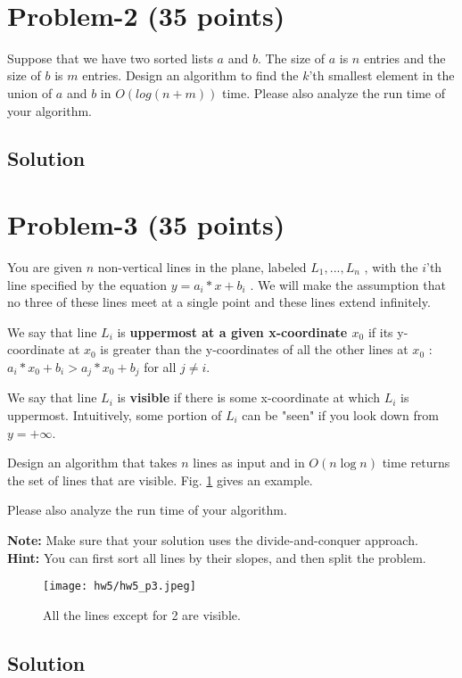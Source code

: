 \documentclass[11pt]{article}
\begin{document}
​
\newpage
\section*{Problem-2 (35 points)}
\noindent
Suppose that we have two sorted lists $a$ and $b$. The size of $a$ is $n$ entries and the size of $b$ is $m$ entries. Design an algorithm to find the $k$’th smallest element in the union of $a$ and $b$ in $O(log(n+m))$ time. Please also analyze the run time of your algorithm.


\subsection*{Solution}



\newpage
\section*{Problem-3 (35 points)}
You are given $n$ non-vertical lines in the plane, labeled $L_1, ..., L_n$ , with the $i$'th line specified by the equation $y = a_i*x + b_i$ . We will make the assumption that no three of these lines  meet at a single point and these lines extend infinitely. 


We say that line $L_i$ is {\bf uppermost at a given
x-coordinate $x_0$} if its y-coordinate at $x_0$ is greater than the y-coordinates
of all the other lines at $x_0$ : $a_i*x_0 + b_i > a_j * x_0 + b_j$ for all $j \neq i$. 


We say that line $L_i$ is
{\bf visible} if there is some x-coordinate at which $L_i$ is uppermost.
Intuitively,
some portion of $L_i$ can be "seen" if you look down from $y = +\infty$.


Design an algorithm that takes $n$ lines as input and in $O(n \log{n})$ time
returns the set of lines that are visible. Fig. \ref{Fig1} gives an example. 

Please also analyze the run time of your algorithm.


\noindent
\textbf{Note:} Make sure that your solution uses the divide-and-conquer approach. \\
\textbf{Hint:} You can first sort all lines by their slopes, and then split the problem. \\




\begin{figure}[H]
\centering
\texttt{[image: hw5/hw5\_p3.jpeg]} 
\caption{All the lines except for 2 are visible.}
\label{Fig1} 
\end{figure}
 
 

\subsection*{Solution}
\end{document}
